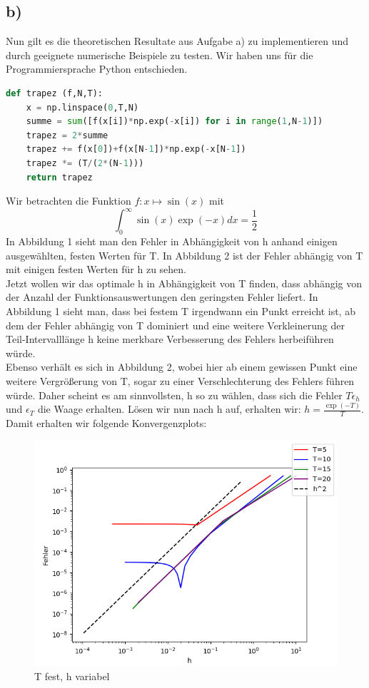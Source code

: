 \subsection*{b)}
Nun gilt es die theoretischen Resultate aus Aufgabe a) zu implementieren und durch geeignete numerische Beispiele zu testen.
Wir haben uns für die Programmiersprache Python entschieden. 
\begin{lstlisting}[language=Python]
def trapez (f,N,T):
    x = np.linspace(0,T,N)
    summe = sum([f(x[i])*np.exp(-x[i]) for i in range(1,N-1)])
    trapez = 2*summe
    trapez += f(x[0])+f(x[N-1])*np.exp(-x[N-1])
    trapez *= (T/(2*(N-1)))
    return trapez
\end{lstlisting}
Wir betrachten die Funktion $f: x \mapsto \sin(x)$ mit
\[\int_{0}^{\infty}\sin(x)\exp(-x)dx = \frac{1}{2}\]
In Abbildung 1 sieht man den Fehler in Abhängigkeit von h anhand einigen ausgewählten, festen Werten für T.
In Abbildung 2 ist der Fehler abhängig von T mit einigen festen Werten für h zu sehen.\\
Jetzt wollen wir das optimale h in Abhängigkeit von T finden, dass abhängig von der Anzahl der Funktionsauswertungen den geringsten Fehler liefert. In Abbildung 1 sieht man, dass bei festem T irgendwann ein Punkt erreicht ist, ab dem der Fehler abhängig von T dominiert und eine weitere Verkleinerung der Teil-Intervalllänge h keine merkbare Verbesserung des Fehlers herbeiführen würde.\\ Ebenso verhält es sich in Abbildung 2, wobei hier ab einem gewissen Punkt eine weitere Vergrößerung von T, sogar zu einer Verschlechterung des Fehlers führen würde. Daher scheint es am sinnvollsten, h so zu wählen, dass sich die Fehler $T\epsilon_h$ und $\epsilon_T$ die Waage erhalten. Lösen wir nun nach h auf, erhalten wir: $h = \frac{\exp(-T)}{T}$.\\
Damit erhalten wir folgende Konvergenzplots:
\begin{figure}
    \centering
    \includegraphics[width=1.2\linewidth]{fehler_h.png}
    \caption{T fest, h variabel}
    \label{fig:my_label}
\end{figure}



